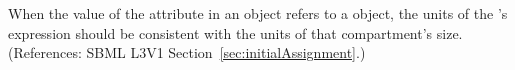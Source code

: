 When the value of the attribute  in an \InitialAssignment
object refers to a \Compartment object, the units of the
\InitialAssignment's  expression should be consistent with the
units of that compartment's size.  (References: SBML L3V1
Section~\ref{sec:initialAssignment}.)
